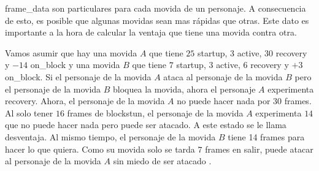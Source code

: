 \gls{frame_data} son particulares para cada movida de un personaje. A consecuencia de esto, es posible que algunas movidas sean mas rápidas que otras. Este dato es importante a la hora de calcular la ventaja que tiene una movida contra otra. 

Vamos asumir que hay una movida $A$ que tiene $25$ \gls{startup}, $3$ \gls{active}, $30$ \gls{recovery} y $-14$ \gls{on_block} y una movida $B$ que tiene $7$ \gls{startup}, $3$ \gls{active}, $6$ \gls{recovery} y $+3$ \gls{on_block}. Si el personaje de la movida $A$ ataca al personaje de la movida $B$ pero el personaje de la movida $B$ bloquea la movida, ahora el personaje $A$ experimenta \gls{recovery}. Ahora, el personaje de la movida $A$ no puede hacer nada por $30$ frames. Al solo tener $16$ frames de \gls{blockstun}, el personaje de la movida $A$ experimenta $14$ que no puede hacer nada pero puede ser atacado. A este estado se le llama desventaja. Al mismo tiempo, el personaje de la movida $B$ tiene 14 frames para hacer lo que quiera. Como su movida solo se tarda $7$ frames en salir, puede atacar al personaje de la movida $A$ sin miedo de ser atacado \cite{noauthor_fighting_nodate}.